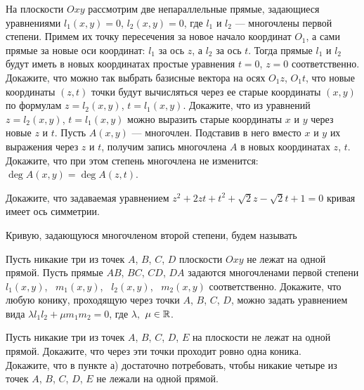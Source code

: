 \documentclass[a4paper,11pt]{article}
\begin{document}






 На плоскости $Oxy$ рассмотрим две
непараллельные  прямые, задающиеся  уравнениями
$l_1(x,y)=0$, $l_2(x,y)=0$, где $l_1$ и $l_2$ --- многочлены первой степени.
Примем их точку пересечения  за новое начало координат $O_1$,
а сами прямые за новые оси координат:  $l_1$ за ось $z$,
а $l_2$ за ось $t$.
Тогда прямые $l_1$ и $l_2$ будут иметь в новых координатах
простые уравнения $t=0$, $z=0$ соответственно.
  Докажите, что можно так выбрать базисные вектора на осях
$O_1z$, $O_1t$, что новые координаты $(z,t)$ точки будут
вычисляться через ее старые координаты $(x,y)$
по формулам $z=l_2(x,y)$, $t=l_1(x,y)$.
 Докажите, что из уравнений $z=l_2(x,y)$, $t=l_1(x,y)$
можно выразить старые координаты $x$ и $y$ через новые $z$ и $t$.
 Пусть $A(x,y)$ --- многочлен. Подставив в него
вместо $x$ и $y$ их выражения через $z$ и $t$, получим запись многочлена
$A$  в новых координатах $z$, $t$.
Докажите, что при этом степень многочлена не
изменится: $\deg A(x,y)=\deg A(z,t)$.


 Докажите, что задаваемая уравнением %
$z^2+2zt+t^2+\sqrt2z-\sqrt2t +1=0$ кривая имеет ось симметрии.


 Кривую, задающуюся многочленом второй степени, будем называть

 \label{abcd}
Пусть никакие три из точек $A$, $B$, $C$, $D$ плоскости $Oxy$ не лежат
на одной прямой. Пусть прямые $AB$, $BC$, $CD$, $DA$ задаются многочленами
первой степени
$l_1(x,y)$, \ $m_1(x,y)$, \ $l_2(x,y)$, \ $m_2(x,y)$ соответственно. Докажите, что  любую конику,
проходящую через  точки $A$, $B$, $C$, $D$, можно задать уравнением
вида
$\lambda l_1l_2+\mu m_1m_2=0$, где $\lambda,$ $\mu\in\mathbb{R}$.

 Пусть никакие три из точек $A$, $B$, $C$, $D$, $E$ на плоскости не
лежат на одной прямой. Докажите, что
через эти точки %
проходит ровно одна коника.  \\ %
 Докажите, что в пункте а) достаточно потребовать, чтобы никакие четыре
из точек $A$, $B$, $C$, $D$, $E$ не лежали на одной прямой.
\end{document}
